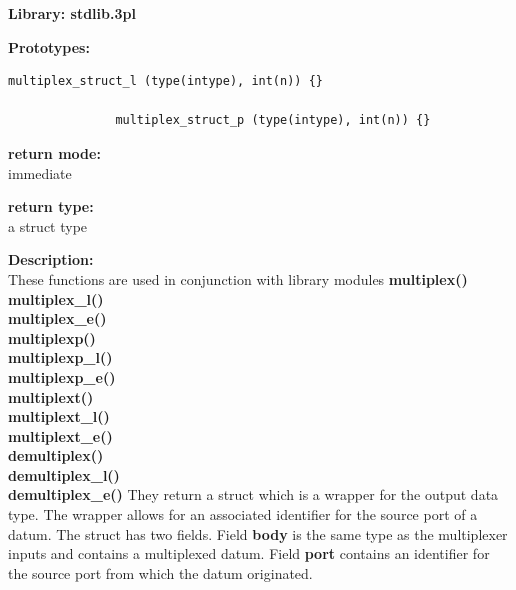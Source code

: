             {\bf Library: stdlib.3pl}

            {\bf Prototypes:} \\
            \vsp
            \begin{lstlisting}[gobble=12, language=threepl]
               multiplex_struct_l (type(intype), int(n)) {}

               multiplex_struct_p (type(intype), int(n)) {}
            \end{lstlisting}

            {\bf return mode:} \\
            immediate

            {\bf return type:} \\
            a struct type

            {\bf Description:} \\
            These functions are used in conjunction with library modules
            {\bf multiplex()}  \\
            {\bf multiplex\_l()}  \\
            {\bf multiplex\_e()}  \\
            {\bf multiplexp()}  \\
            {\bf multiplexp\_l()}  \\
            {\bf multiplexp\_e()}  \\
            {\bf multiplext()}  \\
            {\bf multiplext\_l()}  \\
            {\bf multiplext\_e()}  \\
            {\bf demultiplex()}  \\
            {\bf demultiplex\_l()}  \\
            {\bf demultiplex\_e()} 
            They return a struct which is a
            wrapper for the output data type. The wrapper allows for an
            associated identifier for the source port of a datum. The struct has
            two fields. Field {\bf body} is the same type as the multiplexer
            inputs and contains a multiplexed datum. Field {\bf port} contains
            an identifier for the source port from which the datum originated.

